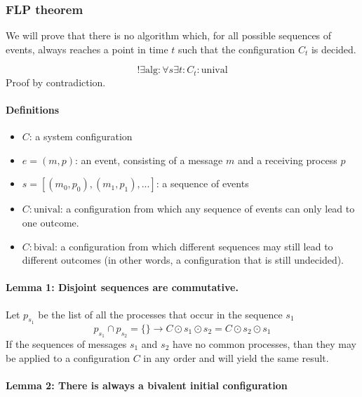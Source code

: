 \hypertarget{flp-theorem}{%
\subsubsection{FLP theorem}\label{flp-theorem}}

We will prove that there is no algorithm which, for all possible
sequences of events, always reaches a point in time \(t\) such that the
configuration \(C_t\) is decided.

\[ !\exists \text{alg}: \forall s \exists t: C_t:\text{unival}   \]
Proof by contradiction.

\hypertarget{definitions}{%
\paragraph{Definitions}\label{definitions}}

\begin{itemize}
 
\item
  \(C\): a system configuration
\item
  \(e = (m, p)\): an event, consisting of a message \(m\) and a
  receiving process \(p\)
\item
  \(s = [(m_0, p_0), (m_1, p_1), ...]\): a sequence of events
\item
  \(C:\text{unival}\): a configuration from which any sequence of events
  can only lead to one outcome.
\item
  \(C:\text{bival}\): a configuration from which different sequences may
  still lead to different outcomes (in other words, a configuration that
  is still undecided).
\end{itemize}

\hypertarget{lemma-1-disjoint-sequences-are-commutative.}{%
\paragraph{Lemma 1: Disjoint sequences are
commutative.}\label{lemma-1-disjoint-sequences-are-commutative.}}

Let \(p_{s_1}\) be the list of all the processes that occur in the
sequence \(s_1\) \[ 
      p_{s_1} \cap p_{s_2} = \{\} \to C \odot s_1 \odot s_2 = C \odot s_2 \odot s_1
\] If the sequences of messages \(s_1\) and \(s_2\) have no common
processes, than they may be applied to a configuration \(C\) in any
order and will yield the same result.

\hypertarget{lemma-2-there-is-always-a-bivalent-initial-configuration}{%
\paragraph{Lemma 2: There is always a bivalent initial
configuration}\label{lemma-2-there-is-always-a-bivalent-initial-configuration}}

